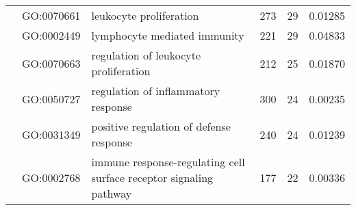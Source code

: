 \documentclass[../main.tex]{subfiles}
\begin{document}
\begin{landscape}
\begin{longtable}{@{}lllccr@{}}
		                                               & GO:0070661                         & leukocyte proliferation                                                   & 273                                                                & 29                                                                   & 0.01285                                                                                  \\
		                                               & GO:0002449                         & lymphocyte mediated immunity                                              & 221                                                                & 29                                                                   & 0.04833                                                                                  \\
		                                               & GO:0070663                         & regulation of leukocyte proliferation                                     & 212                                                                & 25                                                                   & 0.01870                                                                                  \\
		                                               & GO:0050727                         & regulation of inflammatory response                                       & 300                                                                & 24                                                                   & 0.00235                                                                                  \\
		                                               & GO:0031349                         & positive regulation of defense response                                   & 240                                                                & 24                                                                   & 0.01239                                                                                  \\
		                                               & GO:0002768                         & immune response-regulating cell surface receptor signaling pathway        & 177                                                                & 22                                                                   & 0.00336                                                                                  \\

\end{longtable}
\end{landscape}
\end{document}
